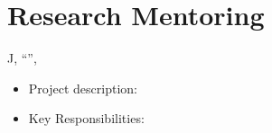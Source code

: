 

\section*{Research Mentoring}
J, ``'', 
\begin{itemize}
	\item Project description: \todo{}
	\item Key Responsibilities: \todo{}
\end{itemize}


